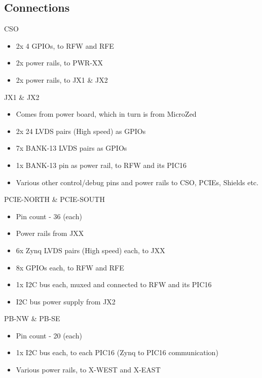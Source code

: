 \documentclass{beamer}
\begin{document}
\subsection{Connections}

\begin{frame}{CSO}
    \begin{itemize}
    \item 2x 4 GPIOs, to RFW and RFE 
    \item 2x power rails, to PWR-XX
    \item 2x power rails, to JX1 \& JX2
    \end{itemize}
\end{frame}

\begin{frame}{JX1 \& JX2}
    \begin{itemize}
    \item Comes from power board, which in turn is from MicroZed
    \item 2x 24 LVDS pairs (High speed) as GPIOs
    \item 7x BANK-13 LVDS pairs as GPIOs
    \item 1x BANK-13 pin as power rail, to RFW and its PIC16
    \item Various other control/debug pins and power rails to CSO, PCIEs, Shields etc.
    \end{itemize}
\end{frame}

\begin{frame}{PCIE-NORTH \& PCIE-SOUTH}
    \begin{itemize}
    \item Pin count - 36 (each)
    \item Power rails from JXX
    \item 6x Zynq LVDS pairs (High speed) each, to JXX
    \item 8x GPIOs each, to RFW and RFE 
    \item 1x I2C bus each, muxed and connected to RFW and its PIC16
    \item I2C bus power supply from JX2
    \end{itemize}
\end{frame}

\begin{frame}{PB-NW \& PB-SE}
    \begin{itemize}
    \item Pin count - 20 (each)
    \item 1x I2C bus each, to each PIC16 (Zynq to PIC16 communication)
    \item Various power rails, to X-WEST and X-EAST
    \end{itemize}
\end{frame}
\end{document}
